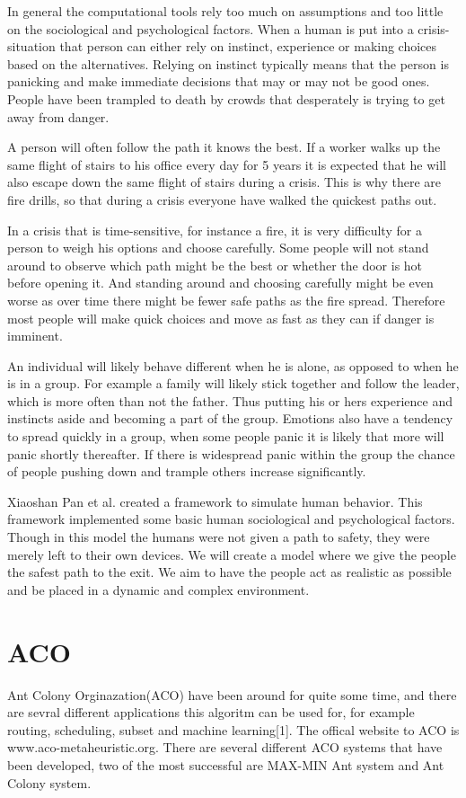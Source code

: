 In general the computational tools rely too much on assumptions and too little on the sociological and psychological  
factors. When a human is put into a crisis-situation that person can either rely on instinct, experience or making  
choices based on the alternatives. Relying on instinct typically means that the person is panicking and make immediate  
decisions that may or may not be good ones. People have been trampled to death by crowds that desperately is trying  
to get away from danger. 
 
A person will often follow the path it knows the best. If a worker walks up the same flight of stairs to his office  
every day for 5 years it is expected that he will also escape down the same flight of stairs during a crisis. This  
is why there are fire drills, so that during a crisis everyone have walked the quickest paths out. 
 
In a crisis that is time-sensitive, for instance a fire, it is very difficulty for a person to weigh his options and  
choose carefully. Some people will not stand around to observe which path might be the best or whether the  
door is hot before opening it. And standing around and choosing carefully might be even worse as  
over time there might be fewer safe paths as the fire spread. Therefore most people will make quick choices 
and move as fast as they can if danger is imminent. 
 
An individual will likely behave different when he is alone, as opposed to when he is in a group. For example  
a family will likely stick together and follow the leader, which is more often than not the father. Thus putting  
his or hers experience and instincts aside and becoming a part of the group. Emotions also have a tendency  
to spread quickly in a group, when some people panic it is likely that more will panic shortly thereafter. If  
there is widespread panic within the group the chance of people pushing down and trample others increase  
significantly. 
 
Xiaoshan Pan et al. created a framework to simulate human behavior. This framework implemented some 
basic human sociological and psychological factors. Though in this model the humans were not given a path 
to safety, they were merely left to their own devices. We will create a model where we give the people the 
safest path to the exit. We aim to have the people act as realistic as possible and be placed in a dynamic 
and complex environment.
 
 
\section{ACO}
Ant Colony Orginazation(ACO) have been around for quite some time, and there are sevral different applications this algoritm can be used for, for example routing, scheduling, subset and machine learning[1]. The offical website to ACO is www.aco-metaheuristic.org. There are several different ACO systems that have been developed, two of the most successful are MAX-MIN Ant system and Ant Colony system.

